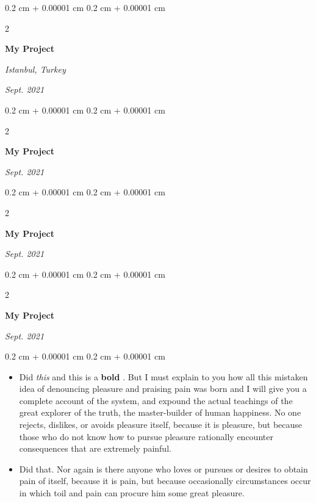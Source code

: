 \documentclass[10pt, letterpaper]{article}
\newenvironment{highlights}{
    \begin{itemize}[
        topsep=0.10 cm,
        parsep=0.10 cm,
        partopsep=0pt,
        itemsep=0pt,
        leftmargin=0.4 cm + 10pt
    ]
}{
    \end{itemize}
} %
\newenvironment{onecolentry}{
    \begin{adjustwidth}{
        0.2 cm + 0.00001 cm
    }{
        0.2 cm + 0.00001 cm
    }
}{
    \end{adjustwidth}
} %
\newenvironment{twocolentry}[2][]{
    \onecolentry
    \def\secondColumn{#2}
    \setcolumnwidth{\fill, 4.5 cm}
    \begin{paracol}{2}
}{
    \switchcolumn \raggedleft \secondColumn
    \end{paracol}
    \endonecolentry
} %
\let\hrefWithoutArrow\href
\renewcommand{\href}[2]{\hrefWithoutArrow{#1}{\mbox{\ifthenelse{\equal{#2}{}}{ }{#2 }\raisebox{.15ex}{\footnotesize \faExternalLink*}}}}
\begin{document}
        \vspace{0.2 cm-3px}

        \begin{twocolentry}{
        \textit{Istanbul, Turkey}    
            
        \textit{Sept. 2021}}
            \textbf{My Project}
        \end{twocolentry}



        \vspace{0.2 cm-3px}

        \begin{twocolentry}{
            
            
        \textit{Sept. 2021}}
            \textbf{My Project}
        \end{twocolentry}



        \vspace{0.2 cm-3px}

        \begin{twocolentry}{
            
            
        \textit{Sept. 2021}}
            \textbf{My Project}
        \end{twocolentry}



        \vspace{0.2 cm-3px}

        \begin{twocolentry}{
            
            
        \textit{Sept. 2021}}
            \textbf{My Project}
        \end{twocolentry}

        \vspace{0.10 cm-3px}
        \begin{onecolentry}
            \begin{highlights}
                \item Did \textit{this} and this is a \textbf{bold} \href{https://example.com}{link}. But I must explain to you how all this mistaken idea of denouncing pleasure and praising pain was born and I will give you a complete account of the system, and expound the actual teachings of the great explorer of the truth, the master-builder of human happiness. No one rejects, dislikes, or avoids pleasure itself, because it is pleasure, but because those who do not know how to pursue pleasure rationally encounter consequences that are extremely painful.
                \item Did that. Nor again is there anyone who loves or pursues or desires to obtain pain of itself, because it is pain, but because occasionally circumstances occur in which toil and pain can procure him some great pleasure.
            \end{highlights}
        \end{onecolentry}
\end{document}
